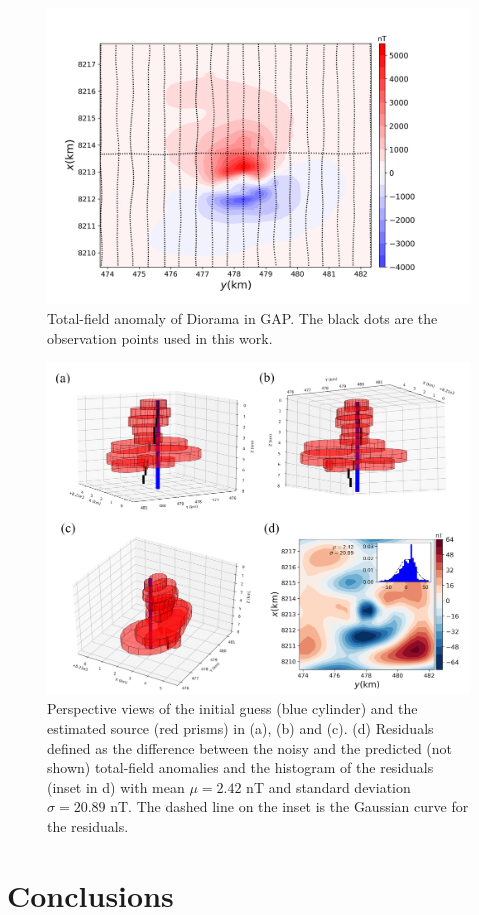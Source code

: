 \documentclass[extra,mreferee]{gji}
\begin{document}
\begin{figure}
    \centering
    \includegraphics[scale=.5]{figures/diorama_real_data.png}
    \caption{Total-field anomaly of Diorama in GAP. The black dots are the observation points used in this work.
}
    \label{fig:real_data}
\end{figure}

\begin{figure}
    \centering
    \includegraphics[scale=.75]{figures/real_data_estimates.png}
    \caption{Perspective views of the initial guess (blue cylinder) and the estimated source (red prisms) in (a), (b) and (c). (d) Residuals defined as the difference between the noisy and the predicted (not shown) total-field anomalies and the histogram of the residuals (inset in d) with mean $\mu=2.42$ nT and standard deviation $\sigma=20.89$ nT. The dashed line on the inset is the Gaussian curve for the residuals.
}
    \label{fig:real_result}
\end{figure}

\section{Conclusions}

\begin{acknowledgments}
\end{acknowledgments}




\appendix

\label{lastpage}
\end{document}
